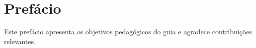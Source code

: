 \chapter*{Prefácio}
\thispagestyle{empty}

Este prefácio apresenta os objetivos pedagógicos do guia e agradece contribuições relevantes. 

